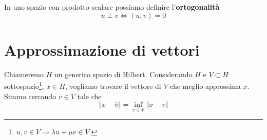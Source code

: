 \documentclass[10pt,a4paper,twoside,openright]{book}
\begin{document}
In uno spazio con prodotto scalare possiamo definire l'\textbf{ortogonalità}
\begin{equation*}
u\perp v\Leftrightarrow (u,v) =0
\end{equation*}
\section{Approssimazione di vettori}

Chiameremo $H$ un generico spazio di Hilbert. Considerando $\displaystyle H$ e $V\subset H$ sottospazio\footnote{$u,v\in V\Rightarrow \lambda u+\mu v\in V$.}, $x\in H$, vogliamo trovare il vettore di $V$ che meglio approssima $x$. Stiamo cercando $\overline{v} \in V$ tale che
\begin{equation*}
\Vert x-\overline{v}\Vert =\inf_{v\in V}\Vert x-v\Vert 
\end{equation*}
\end{document}
